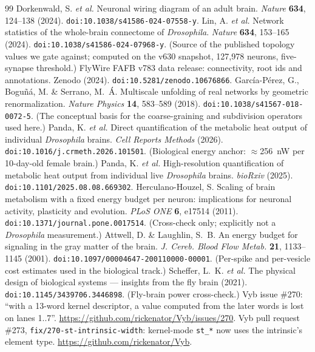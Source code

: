 \documentclass[11pt,a4paper]{article}
\newcommand{\code}[1]{\texttt{\footnotesize #1}}
\begin{document}
\begin{thebibliography}{99}\small
{} Dorkenwald, S. \textit{et al.} Neuronal wiring diagram of an adult
brain. \textit{Nature} \textbf{634}, 124--138 (2024). \code{doi:10.1038/s41586-024-07558-y}.
 Lin, A. \textit{et al.} Network statistics of the whole-brain
connectome of \textit{Drosophila}. \textit{Nature} \textbf{634}, 153--165 (2024).
\code{doi:10.1038/s41586-024-07968-y}. (Source of the published topology values we gate against;
computed on the v630 snapshot, 127{,}978 neurons, five-synapse threshold.)
 FlyWire FAFB v783 data release: connectivity, root ids and annotations.
Zenodo (2024). \code{doi:10.5281/zenodo.10676866}.
 García-Pérez, G., Boguñá, M. \& Serrano, M.~Á. Multiscale unfolding of real
networks by geometric renormalization. \textit{Nature Physics} \textbf{14}, 583--589 (2018).
\code{doi:10.1038/s41567-018-0072-5}. (The conceptual basis for the coarse-graining and
subdivision operators used here.)
 Panda, K. \textit{et al.} Direct quantification of the metabolic heat
output of individual \textit{Drosophila} brains. \textit{Cell Reports Methods} (2026).
\code{doi:10.1016/j.crmeth.2026.101501}. (Biological energy anchor: $\approx$256~nW per
10-day-old female brain.)
 Panda, K. \textit{et al.} High-resolution quantification of metabolic
heat output from individual live \textit{Drosophila} brains. \textit{bioRxiv} (2025).
\code{doi:10.1101/2025.08.08.669302}.
 Herculano-Houzel, S. Scaling of brain metabolism with a fixed energy
budget per neuron: implications for neuronal activity, plasticity and evolution. \textit{PLoS
ONE} \textbf{6}, e17514 (2011). \code{doi:10.1371/journal.pone.0017514}. (Cross-check only;
explicitly not a \textit{Drosophila} measurement.)
 Attwell, D. \& Laughlin, S.~B. An energy budget for signaling in the
gray matter of the brain. \textit{J. Cereb. Blood Flow Metab.} \textbf{21}, 1133--1145 (2001).
\code{doi:10.1097/00004647-200110000-00001}. (Per-spike and per-vesicle cost estimates used in
the biological track.)
 Scheffer, L.~K. \textit{et al.} The physical design of biological
systems --- insights from the fly brain (2021). \code{doi:10.1145/3439706.3446898}. (Fly-brain
power cross-check.)
 Vyb issue \#270: ``with a 13-word kernel descriptor, a value computed from
the later words is lost on lanes 1..7''. \url{https://github.com/rickenator/Vyb/issues/270}.
 Vyb pull request \#273, \code{fix/270-st-intrinsic-width}: kernel-mode
\code{st\_*} now uses the intrinsic's element type. \url{https://github.com/rickenator/Vyb}.
\end{thebibliography}
\end{document}
